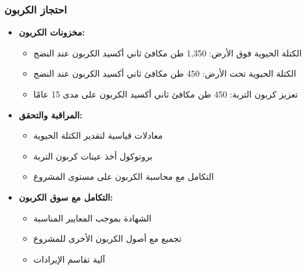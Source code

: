 \subsubsection{احتجاز الكربون}
\begin{itemize}
    \item \textbf{مخزونات الكربون:}
    \begin{itemize}
        \item الكتلة الحيوية فوق الأرض: 1,350 طن مكافئ ثاني أكسيد الكربون عند النضج
        \item الكتلة الحيوية تحت الأرض: 450 طن مكافئ ثاني أكسيد الكربون عند النضج
        \item تعزيز كربون التربة: 450 طن مكافئ ثاني أكسيد الكربون على مدى 15 عامًا
    \end{itemize}
    \item \textbf{المراقبة والتحقق:}
    \begin{itemize}
        \item معادلات قياسية لتقدير الكتلة الحيوية
        \item بروتوكول أخذ عينات كربون التربة
        \item التكامل مع محاسبة الكربون على مستوى المشروع
    \end{itemize}
    \item \textbf{التكامل مع سوق الكربون:}
    \begin{itemize}
        \item الشهادة بموجب المعايير المناسبة
        \item تجميع مع أصول الكربون الأخرى للمشروع
        \item آلية تقاسم الإيرادات
    \end{itemize}
\end{itemize}

